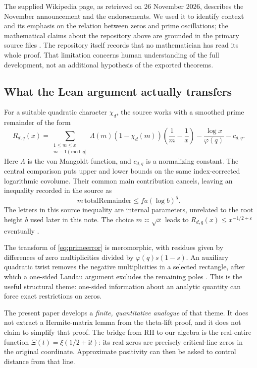 \documentclass[11pt]{article}
\theoremstyle{definition}
\newcommand{\I}{\mathrm i}
\begin{document}
The supplied Wikipedia page, as retrieved on 26 November 2026, describes the
November announcement and the endorsements. We used it to identify context
and its emphasis on the relation between zeros and prime oscillations; the
mathematical claims about the repository above are grounded in the primary
source files \cite{wiki}. The repository itself records that no mathematician
has read its whole proof. That limitation concerns human understanding of the
full development, not an additional hypothesis of the exported theorems.

\subsection{What the Lean argument actually transfers}

For a suitable quadratic character $\chi_d$, the source works with a smoothed
prime remainder of the form
\begin{equation}
 R_{d,q}(x)=
 \sum_{\substack{1\leq m\leq x\\m\equiv1\pmod q}}
 \Lambda(m)(1-\chi_d(m))\left(\frac1m-\frac1x\right)
 -\frac{\log x}{\varphi(q)}-c_{d,q}.
 \label{eq:primeerror}
\end{equation}
Here $\Lambda$ is the von Mangoldt function, and $c_{d,q}$ is a normalizing
constant. The central comparison puts upper and lower bounds on the same
index-corrected logarithmic covolume. Their common main contribution cancels,
leaving an inequality recorded in the source as
\[
 m\,\mathrm{totalRemainder}\leq f a(\log b)^5.
\]
The letters in this source inequality are internal parameters, unrelated to
the root height $b$ used later in this note. The choice $m\asymp\sqrt{x}$ leads
to $R_{d,q}(x)\leq x^{-1/2+\varepsilon}$ eventually
\cite{mainineq,onesided}.

The transform of \eqref{eq:primeerror} is meromorphic, with residues given by
differences of zero multiplicities divided by
$\varphi(q)s(1-s)$. An auxiliary quadratic twist removes the negative
multiplicities in a selected rectangle, after which a one-sided Landau
argument excludes the remaining poles \cite{primeerror,criterion,landau}.
This is the useful structural theme: one-sided information about an analytic
quantity can force exact restrictions on zeros.

The present paper develops a \emph{finite, quantitative analogue} of that
theme. It does not extract a Hermite-matrix lemma from the theta-lift proof,
and it does not claim to simplify that proof. The bridge from RH to our
algebra is the real-entire function $\Xi(t)=\xi(1/2+\I t)$: its real zeros
are precisely critical-line zeros in the original coordinate. Approximate
positivity can then be asked to control distance from that line.
\end{document}
